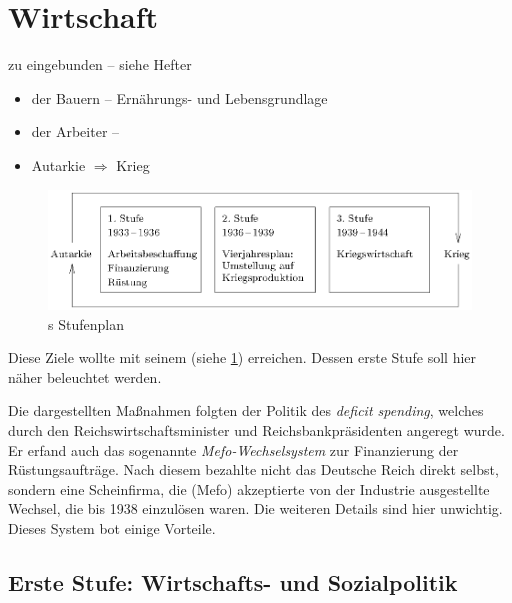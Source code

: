 \section{Wirtschaft}

\begin{aufgabe}
zu eingebunden -- siehe Hefter
\end{aufgabe}

\begin{itemize}
\item {} der Bauern -- Ernährungs- und Lebensgrundlage
\item {} der Arbeiter --
\item Autarkie $\Rightarrow$ Krieg
\end{itemize}

\begin{figure}
\includegraphics[width=\textwidth]{hit-stufpla.eps}
\caption{s Stufenplan}
\label{pic:hit-stufpla}
\end{figure}

Diese Ziele wollte  mit seinem
 (siehe \ref{pic:hit-stufpla}) erreichen. Dessen erste
Stufe soll hier näher beleuchtet werden. 

Die dargestellten Maßnahmen folgten der Politik des \emph{deficit
spending}, welches durch den
Reichswirtschaftsminister und Reichsbankpräsidenten  angeregt wurde. Er erfand auch das
sogenannte \emph{Mefo-Wechselsystem} zur
Finanzierung der Rüstungsaufträge. Nach diesem bezahlte nicht das
Deutsche Reich direkt selbst, sondern eine Scheinfirma, die  (Mefo) akzeptierte von der Industrie
ausgestellte Wechsel, die bis 1938 einzulösen waren. Die weiteren
Details sind hier unwichtig. Dieses System bot einige
Vorteile.


\subsection{Erste Stufe: Wirtschafts- und
Sozialpolitik}

